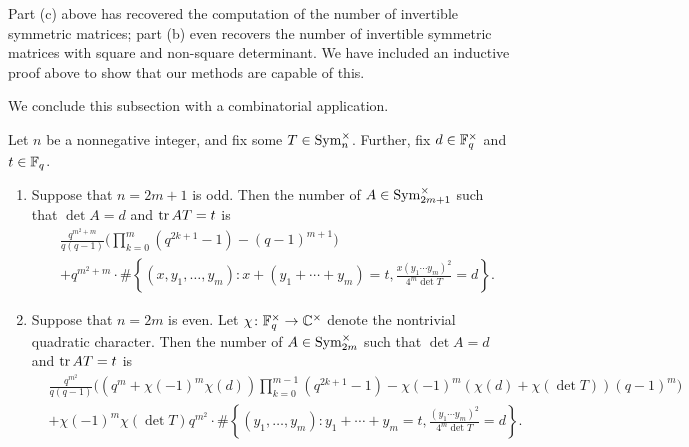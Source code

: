 \begin{remark}
    Part (c) above has recovered the computation of the number of invertible symmetric matrices; part (b) even recovers the number of invertible symmetric matrices with square and non-square determinant. We have included an inductive proof above to show that our methods are capable of this.
\end{remark}
We conclude this subsection with a combinatorial application.
\begin{corollary} \label{cor:count-sym}
    Let $n$ be a nonnegative integer, and fix some $T\in\operatorname{Sym}_n^\times$. Further, fix $d\in\mathbb F_q^\times$ and $t\in\mathbb F_q$.
    \begin{enumerate}[label=(\alph*)]
        \item Suppose that $n=2m+1$ is odd. Then the number of $A\in\operatorname{Sym}_{2m+1}^\times$ such that $\det A=d$ and $\operatorname{tr} AT=t$ is
        \begin{align*}
            &\frac{q^{m^2+m}}{q(q-1)}\Bigg(\prod_{k=0}^m\left(q^{2k+1}-1\right)-(q-1)^{m+1}\Bigg) \\
            &+q^{m^2+m}\cdot\#\left\{(x,y_1,\ldots,y_m):x+(y_1+\cdots+y_m)=t,\frac{x(y_1\cdots y_m)^2}{4^m\det T}=d\right\}.
        \end{align*}
        \item Suppose that $n=2m$ is even. Let $\chi\colon\mathbb F_q^\times\to\mathbb C^\times$ denote the nontrivial quadratic character. Then the number of $A\in\operatorname{Sym}_{2m}^\times$ such that $\det A=d$ and $\operatorname{tr} AT=t$ is
        \begin{align*}
            &\frac{q^{m^2}}{q(q-1)}\Bigg(\left(q^m+\chi(-1)^m\chi(d)\right)\prod_{k=0}^{m-1}\left(q^{2k+1}-1\right)-\chi(-1)^m\left(\chi(d)+\chi(\det T)\right)(q-1)^m\Bigg) \\
            &+\chi(-1)^m\chi(\det T)q^{m^2}\cdot\#\left\{(y_1,\ldots,y_m):y_1+\cdots+y_m=t,\frac{(y_1\cdots y_m)^2}{4^m\det T}=d\right\}.
        \end{align*}
    \end{enumerate}
\end{corollary}
